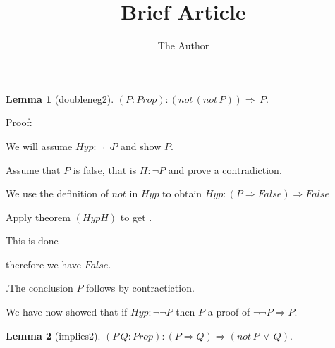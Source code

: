 \documentclass[11pt, oneside]{article}
\title{Brief Article}
\author{The Author}
\date{}							%
\newtheorem{Lemma}{Lemma}
\begin{document}
\maketitle

\begin{Lemma}[doubleneg2] 
$(P:Prop):(not\,(not\,P))\Rightarrow \,P.$
 \end{Lemma}


 Proof: \begin{subproof}We will assume $Hyp : ¬ ¬ P $ and show $P $.\begin{subproof}Assume that $P $ is false, that is $H : ¬ P $ and prove a contradiction.\begin{subproof}We use the definition of $not$ in $Hyp$ to obtain $Hyp : (P \Rightarrow False) \Rightarrow False $ \begin{subproof}Apply theorem $(Hyp H)$ to get $ $.\begin{subproof}This is done\end{subproof}\end{subproof} therefore we have $False $.\end{subproof}.The conclusion $P $ follows by contractiction.\end{subproof} We have now showed that if $Hyp : ¬ ¬ P $ then $P $ a proof of $¬ ¬ P \Rightarrow P $.\end{subproof}
 
 \begin{Lemma}[implies2] 
$(P\,Q:Prop):(P\Rightarrow Q)\Rightarrow (not\,P\,\lor \,Q).$
 \end{Lemma}
\end{document}
